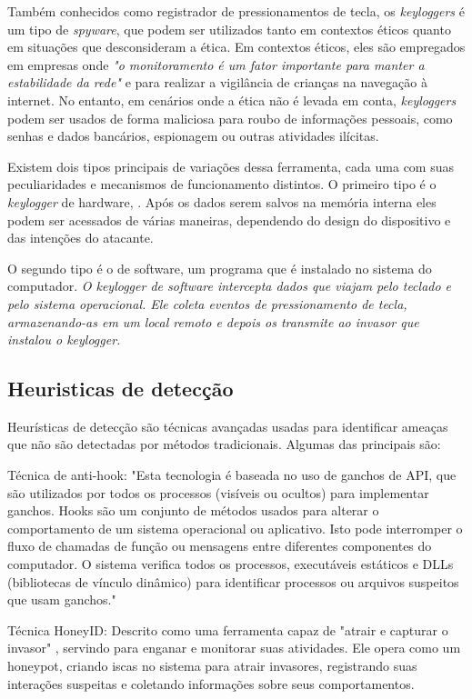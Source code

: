 \documentclass[12pt]{article}
\begin{document}
Também conhecidos como registrador de pressionamentos de tecla, os \textit{keyloggers} é um tipo de \textit{spyware}, que podem ser utilizados tanto em contextos éticos quanto em situações que desconsideram a ética. Em contextos éticos, eles são empregados em empresas onde \textit{"o monitoramento é um fator importante para manter a estabilidade da rede"} \citep{tuli2013system} e para realizar a vigilância de crianças na navegação à internet. No entanto, em cenários onde a ética não é levada em conta, \textit{keyloggers} podem ser usados de forma maliciosa para roubo de informações pessoais, como senhas e dados bancários, espionagem ou outras atividades ilícitas.

Existem dois tipos principais de variações dessa ferramenta, cada uma com suas peculiaridades e mecanismos de funcionamento distintos. O primeiro tipo é o \textit{keylogger} de hardware, \textit{}\citep{singh2021keylogger}. Após os dados serem salvos na memória interna eles podem ser acessados de várias maneiras, dependendo do design do dispositivo e das intenções do atacante.

O segundo tipo é o de software, um programa que é instalado no sistema do computador. \textit{O keylogger de software intercepta dados que viajam pelo teclado e pelo sistema operacional. Ele coleta eventos de pressionamento de tecla, armazenando-as em um local remoto e depois os transmite ao invasor que instalou o keylogger.} \citep{ahmed2014survey}

\subsection{Heuristicas de detecção}
Heurísticas de detecção são técnicas avançadas usadas para identificar ameaças que não são detectadas por métodos tradicionais. Algumas das principais são:

Técnica de anti-hook: "Esta tecnologia é baseada no uso de ganchos de API, que são utilizados por todos os processos (visíveis ou ocultos) para implementar ganchos. Hooks são um conjunto de métodos usados para alterar o comportamento de um sistema operacional ou aplicativo. Isto pode interromper o fluxo de chamadas de função ou mensagens entre diferentes componentes do computador. O sistema verifica todos os processos, executáveis estáticos e DLLs (bibliotecas de vínculo dinâmico) para identificar processos ou arquivos suspeitos que usam ganchos."\citep{solairaj2016keyloggers}

Técnica HoneyID: Descrito como uma ferramenta capaz de "atrair e capturar o invasor" \citep{10124477}, servindo para enganar e monitorar suas atividades. Ele opera como um honeypot, criando iscas no sistema para atrair invasores, registrando suas interações suspeitas e coletando informações sobre seus comportamentos.
\end{document}
